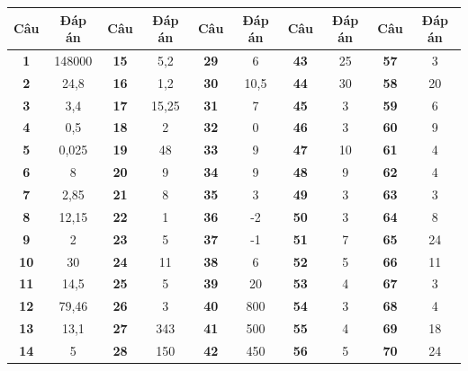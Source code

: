 \documentclass[12pt,a4paper]{article}
\begin{document}
\begin{center}
\renewcommand{\arraystretch}{1.28}
\begin{tabular}{|c|c|c|c|c|c|c|c|c|c|}
\hline
\textbf{Câu} & \textbf{Đáp án} & \textbf{Câu} & \textbf{Đáp án} & \textbf{Câu} & \textbf{Đáp án} & \textbf{Câu} & \textbf{Đáp án} & \textbf{Câu} & \textbf{Đáp án} \\ \hline
\textbf{1} & 148000 & \textbf{15} & 5,2 & \textbf{29} & 6 & \textbf{43} & 25 & \textbf{57} & 3 \\ \hline
\textbf{2} & 24,8 & \textbf{16} & 1,2 & \textbf{30} & 10,5 & \textbf{44} & 30 & \textbf{58} & 20 \\ \hline
\textbf{3} & 3,4 & \textbf{17} & 15,25 & \textbf{31} & 7 & \textbf{45} & 3 & \textbf{59} & 6 \\ \hline
\textbf{4} & 0,5 & \textbf{18} & 2 & \textbf{32} & 0 & \textbf{46} & 3 & \textbf{60} & 9 \\ \hline
\textbf{5} & 0,025 & \textbf{19} & 48 & \textbf{33} & 9 & \textbf{47} & 10 & \textbf{61} & 4 \\ \hline
\textbf{6} & 8 & \textbf{20} & 9 & \textbf{34} & 9 & \textbf{48} & 9 & \textbf{62} & 4 \\ \hline
\textbf{7} & 2,85 & \textbf{21} & 8 & \textbf{35} & 3 & \textbf{49} & 3 & \textbf{63} & 3 \\ \hline
\textbf{8} & 12,15 & \textbf{22} & 1 & \textbf{36} & -2 & \textbf{50} & 3 & \textbf{64} & 8 \\ \hline
\textbf{9} & 2 & \textbf{23} & 5 & \textbf{37} & -1 & \textbf{51} & 7 & \textbf{65} & 24 \\ \hline
\textbf{10} & 30 & \textbf{24} & 11 & \textbf{38} & 6 & \textbf{52} & 5 & \textbf{66} & 11 \\ \hline
\textbf{11} & 14,5 & \textbf{25} & 5 & \textbf{39} & 20 & \textbf{53} & 4 & \textbf{67} & 3 \\ \hline
\textbf{12} & 79,46 & \textbf{26} & 3 & \textbf{40} & 800 & \textbf{54} & 3 & \textbf{68} & 4 \\ \hline
\textbf{13} & 13,1 & \textbf{27} & 343 & \textbf{41} & 500 & \textbf{55} & 4 & \textbf{69} & 18 \\ \hline
\textbf{14} & 5 & \textbf{28} & 150 & \textbf{42} & 450 & \textbf{56} & 5 & \textbf{70} & 24 \\ \hline
\end{tabular}
\end{center}

\vspace{4pt}
\end{document}
